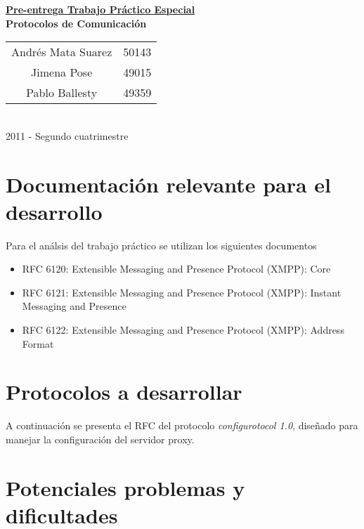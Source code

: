 \documentclass[a4paper,10pt]{article}
\begin{document}
\begin{titlepage}
\begin{center}
 \huge \underline{\textbf{Pre-entrega Trabajo Práctico Especial}}\\[0.05cm]
 \normalsize \textbf{Protocolos de Comunicación}\\[1cm]

\large
\begin{tabular}{c @{ - } l}
 Andrés Mata Suarez & 50143 \\
 Jimena Pose & 49015 \\
 Pablo Ballesty & 49359 \\
\end{tabular}\\[21.4cm]
 2011 - Segundo cuatrimestre
\end{center}

\end{titlepage}

\setcounter{tocdepth}{2}
\tableofcontents


\newpage
\section{Documentación relevante para el desarrollo}

Para el análsis del trabajo práctico se utilizan los siguientes documentos
\begin{itemize}
 \item RFC 6120: Extensible Messaging and Presence Protocol (XMPP): Core
 \item RFC 6121: Extensible Messaging and Presence Protocol (XMPP): Instant Messaging and Presence
 \item RFC 6122: Extensible Messaging and Presence Protocol (XMPP): Address Format

\end{itemize}

\section{Protocolos a desarrollar}
A continuación se presenta el RFC del protocolo \textit{configurotocol 1.0}, diseñado para manejar la configuración
del servidor proxy.



\section{Potenciales problemas y dificultades}
\end{document}

